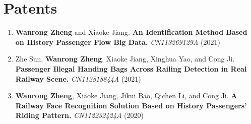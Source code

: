 \documentclass[a4,10pt]{article}
\begin{document}
\section{Patents}
\begin{enumerate}[leftmargin=*]

  \item \textbf{Wanrong Zheng} and Xiaoke Jiang. \textbf{An Identification Method Based on History Passenger Flow Big Data.} \textit{CN113269129A} (2021)

  \item Zhe Sun, \textbf{Wanrong Zheng}, Xiaoke Jiang, Xinghua Yao, and Cong Ji. \textbf{Passenger Illegal Handing Bags Across Railing Detection in Real Railway Scene.} \textit{CN112818844A} (2021)

  \item \textbf{Wanrong Zheng}, Xiaoke Jiang, Jikui Bao, Qichen Li, and Cong Ji. \textbf{A Railway Face Recognition Solution Based on History Passengers' Riding Pattern.} \textit{CN112232424A} (2020)
\end{enumerate}
\end{document}
